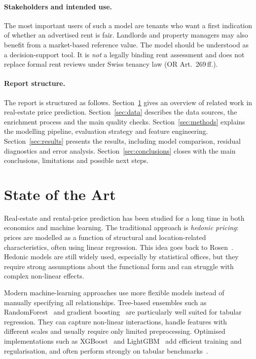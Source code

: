 \documentclass[11pt,a4paper]{article}
\begin{document}
\paragraph{Stakeholders and intended use.}
The most important users of such a model are tenants who want a first indication of whether an advertised rent is fair. Landlords and property managers may also benefit from a market-based reference value. The model should be understood as a decision-support tool. It is \emph{not} a legally binding rent assessment and does not replace formal rent reviews under Swiss tenancy law (OR Art.~269\,ff.).

\paragraph{Report structure.}
The report is structured as follows. Section~\ref{sec:sota} gives an overview of related work in real-estate price prediction. Section~\ref{sec:data} describes the data sources, the enrichment process and the main quality checks. Section~\ref{sec:methods} explains the modelling pipeline, evaluation strategy and feature engineering. Section~\ref{sec:results} presents the results, including model comparison, residual diagnostics and error analysis. Section~\ref{sec:conclusions} closes with the main conclusions, limitations and possible next steps.

\section{State of the Art}
\label{sec:sota}

Real-estate and rental-price prediction has been studied for a long time in both economics and machine learning. The traditional approach is \emph{hedonic pricing}: prices are modelled as a function of structural and location-related characteristics, often using linear regression. This idea goes back to Rosen~\citep{rosen1974hedonic}. Hedonic models are still widely used, especially by statistical offices, but they require strong assumptions about the functional form and can struggle with complex non-linear effects.

Modern machine-learning approaches use more flexible models instead of manually specifying all relationships. Tree-based ensembles such as RandomForest~\citep{breiman2001randomforest} and gradient boosting~\citep{friedman2001gbm} are particularly well suited for tabular regression. They can capture non-linear interactions, handle features with different scales and usually require only limited preprocessing. Optimised implementations such as XGBoost~\citep{chen2016xgboost} and LightGBM~\citep{ke2017lightgbm} add efficient training and regularisation, and often perform strongly on tabular benchmarks~\citep{shwartz2022tabular}.
\end{document}
